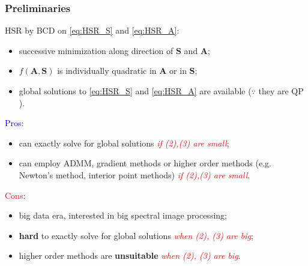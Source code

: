 \documentclass[10pt,mathserif]{beamer}
\begin{document}
    \begin{frame} \label{fr:HSR-is-QP}
        \frametitle{Preliminaries}
        HSR by BCD on \eqref{eq:HSR_S} and \eqref{eq:HSR_A}: \\
        \begin{itemize}
            \item successive minimization along direction of $\bm S$ and $\bm A$;
            \item $f(\bm A,\bm S)$ is individually quadratic in $\bm A$ or in $\bm S$;
            \item global solutions to \eqref{eq:HSR_S} and \eqref{eq:HSR_A} are available ($\because$ they are QP \hyperlink{fr:HSR-as-QP}{}).
        \end{itemize}
        \vspace{0.3cm}
        \textcolor{blue}{Pros}:
        \begin{itemize}
            \item can exactly solve for global solutions
                  \textcolor{red}{\textit{if (2),(3) are small}};
            \item can employ ADMM, gradient methods or higher order methods \newline
                  (e.g. Newton's method, interior point methods)
                  \textcolor{red}{\textit{if (2),(3) are small}}.
        \end{itemize}
        \vspace{0.3cm}
        \textcolor{red}{Cons}:
        \begin{itemize}
            \item big data era, interested in big spectral image processing;
            \item \textbf{hard} to exactly solve for global solutions \textcolor{red}{\textit{when (2), (3) are big}};
            \item higher order methods are \textbf{unsuitable} \textcolor{red}{\textit{when (2), (3) are big}}.
        \end{itemize}
    \end{frame}
\end{document}

